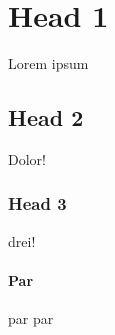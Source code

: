 \section{Head 1}
Lorem ipsum

\subsection{Head 2}
Dolor!

\subsubsection{Head 3}
drei!

\paragraph{Par}
par par

